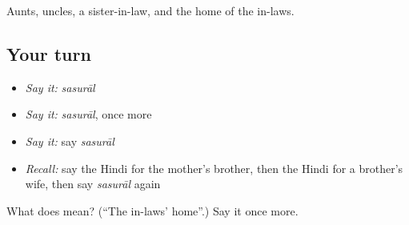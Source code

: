 \begin{grammarlens}[title={What you've built}]
Aunts, uncles, a sister-in-law, and the home of the in-laws.
\end{grammarlens}

\subsection*{Your turn}
\begin{itemize}
\raggedright
  \item \emph{Say it:} \emph{sasurāl}
  \item \emph{Say it:} \emph{sasurāl}, once more
  \item \emph{Say it:} say \emph{sasurāl}
  \item \emph{Recall:} say the Hindi for the mother's brother, then the Hindi for a brother's wife, then say \emph{sasurāl} again
\end{itemize}

\begin{tcolorbox}[breakable,colback=teal!4,colframe=teal!35!black,title={Before you move on}]
What does  mean? (\textquotedblleft{}The in-laws' home\textquotedblright{}.) Say it once more.
\end{tcolorbox}
